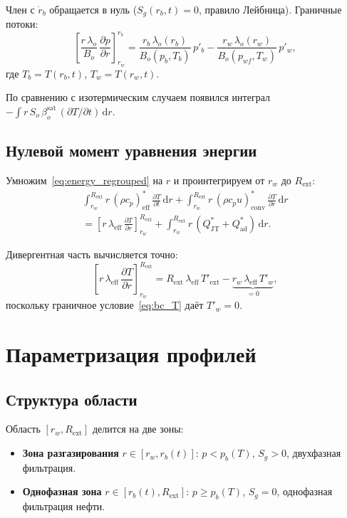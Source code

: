 \documentclass[12pt,a4paper]{article}
\newcommand{\dd}{\mathrm{d}}
\newcommand{\pp}{\partial}
\newcommand{\ext}{\mathrm{ext}}
\newcommand{\eff}{\mathrm{eff}}
\newcommand{\sat}{\mathrm{sat}}
\begin{document}
Член с $\dot{r}_b$ обращается в нуль ($S_g(r_b,t) = 0$,
правило Лейбница). Граничные потоки:
\begin{equation}\label{eq:Sg_flux}
  \left[\frac{r\,\lambda_o}{B_o}\,\frac{\pp p}{\pp r}\right]_{r_w}^{r_b}
  = \frac{r_b\,\lambda_o(r_b)}{B_o(p_b,T_b)}\,p'_b
    - \frac{r_w\,\lambda_o(r_w)}{B_o(p_{wf},T_w)}\,p'_w,
\end{equation}
где $T_b = T(r_b,t)$, $T_w = T(r_w,t)$.

По сравнению с изотермическим случаем появился
интеграл $-\int r\,S_o\,\beta_o^\sat\,(\pp T/\pp t)\,\dd r$.


\subsection{Нулевой момент уравнения энергии}

Умножим~\eqref{eq:energy_regrouped} на $r$ и проинтегрируем
от $r_w$ до $R_\ext$:
\begin{multline}\label{eq:T_moment0}
  \int_{r_w}^{R_\ext} r\,(\rho c_p)_\eff^*\,
    \frac{\pp T}{\pp t}\,\dd r
  + \int_{r_w}^{R_\ext} r\,(\rho c_p u)_\mathrm{conv}^*\,
    \frac{\pp T}{\pp r}\,\dd r \\
  = \left[r\,\lambda_\eff\,\frac{\pp T}{\pp r}
    \right]_{r_w}^{R_\ext}
  + \int_{r_w}^{R_\ext} r\,(Q_\mathrm{JT}^* + Q_\mathrm{ad}^*)\,\dd r.
\end{multline}

Дивергентная часть вычисляется точно:
\begin{equation}\label{eq:T_flux}
  \left[r\,\lambda_\eff\,\frac{\pp T}{\pp r}
    \right]_{r_w}^{R_\ext}
  = R_\ext\,\lambda_\eff\,T'_\ext
    - \underbrace{r_w\,\lambda_\eff\,T'_w}_{= 0},
\end{equation}
поскольку граничное условие~\eqref{eq:bc_T} даёт $T'_w = 0$.


\section{Параметризация профилей}\label{sec:profiles}

\subsection{Структура области}

Область $[r_w, R_\ext]$ делится на две зоны:
\begin{itemize}[nosep]
  \item \textbf{Зона разгазирования} $r \in [r_w, r_b(t)]$:
        $p < p_b(T)$, $S_g > 0$, двухфазная фильтрация.
  \item \textbf{Однофазная зона} $r \in [r_b(t), R_\ext]$:
        $p \geqslant p_b(T)$, $S_g = 0$, однофазная фильтрация нефти.
\end{itemize}
\end{document}
